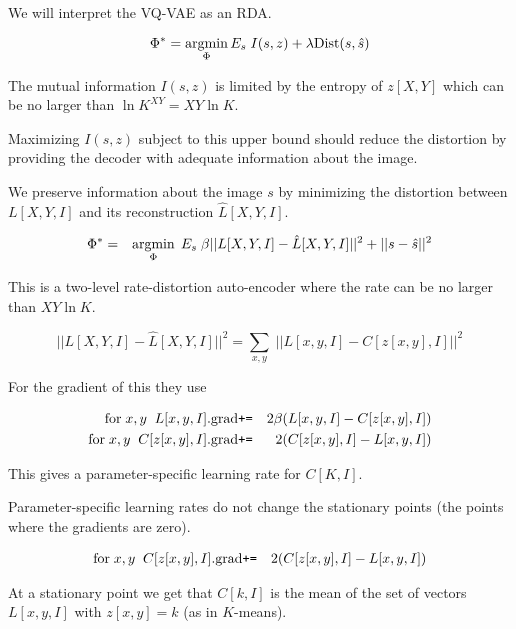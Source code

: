 {

We will interpret the VQ-VAE as an RDA.

$$\Phi^*  =  \operatorname*{argmin}_\Phi E_s\;I(s,z) + \lambda\mathrm{Dist}(s,\hat{s})$$

\vfill
The mutual information $I(s,z)$ is limited by the entropy of $z[X,Y]$ which can be no larger than $\ln K^{XY} = XY\ln K$.

\vfill
Maximizing $I(s,z)$ subject to this upper bound should reduce the distortion by providing the decoder with adequate information
about the image.


We preserve information about the image $s$ by minimizing the distortion between $L[X,Y,I]$ and its reconstruction $\hat{L}[X,Y,I]$.

\vfill
\begin{eqnarray*}
\Phi^* & = & \operatorname*{argmin}_\Phi \;E_s\; \beta||L[X,Y,I] - \hat{L}[X,Y,I]||^2 + ||s -\hat{s}||^2
\end{eqnarray*}

\vfill
This is a two-level rate-distortion auto-encoder where the rate can be no larger than $XY\ln K$.


$$||L[X,Y,I] - \hat{L}[X,Y,I]||^2 = \sum_{x,y}\;||L[x,y,I] - C[z[x,y],I]||^2$$

\vfill
For the gradient of this they use

\begin{eqnarray*}
\mathrm{for}\;x,y\;\;L[x,y,I].\mathrm{grad} & \mbox{\tt +=} & 2\beta({L}[x,y,I]- C[z[x,y],I]) \\
\mathrm{for}\;x,y\;\;C[z[x,y],I].\mathrm{grad} & \mbox{\tt +=} & 2(C[z[x,y],I] - L[x,y,I])
\end{eqnarray*}

\vfill
This gives a parameter-specific learning rate for $C[K,I]$.

\vfill
Parameter-specific learning rates do not change the stationary points (the points where the gradients are zero).


\begin{eqnarray*}
\mathrm{for}\;x,y\;\;C[z[x,y],I].\mathrm{grad} & \mbox{\tt +=} & 2(C[z[x,y],I] - L[x,y,I])
\end{eqnarray*}

\vfill
At a stationary point we get that $C[k,I]$ is the mean of the set of vectors $L[x,y,I]$ with $z[x,y] = k$ (as in $K$-means).

}
